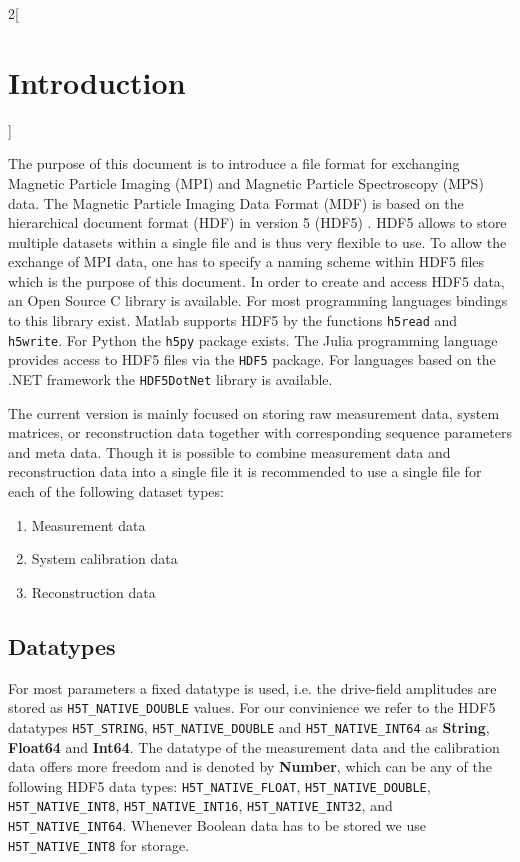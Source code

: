 \documentclass[landscape,a4paper]{article} %
\newcommand{\inl}[1]{\lstinline[columns=fixed]{#1}}
\newcommand{\inltab}[1]{{\ttfamily\bfseries\color{blue}#1}}
\begin{document}
\begin{multicols}{2}[\section{Introduction} \label{Sec:Introduction}]

The purpose of this document is to introduce a file format for exchanging Magnetic Particle Imaging (MPI) and Magnetic Particle Spectroscopy (MPS) data. The Magnetic Particle Imaging Data Format (MDF) is based on the hierarchical document format (HDF) in version 5 (HDF5) \cite{hdf5}. HDF5 allows to store multiple datasets within a single file and is thus very flexible to use. To allow the exchange of MPI data, one has to specify a naming scheme within HDF5 files which is the purpose of this document. In order to create and access HDF5 data, an Open Source C library is available. For most programming languages bindings to this library exist. Matlab supports HDF5 by the functions \inl{h5read} and \inl{h5write}. For Python the \inl{h5py} package exists. The Julia programming language provides access to HDF5 files via the \inl{HDF5} package. For languages based on the .NET framework the \inl{HDF5DotNet} library is available.

The current version is mainly focused on storing raw measurement data, system matrices, or reconstruction data together with corresponding sequence parameters and meta data. Though it is possible to combine measurement data and reconstruction data into a single file it is recommended to use a single file for each of the following dataset types:
\begin{enumerate}
\setlength{\itemsep}{0pt}
\item Measurement data
\item System calibration data
\item Reconstruction data
\end{enumerate}

\subsection{Datatypes}

For most parameters a fixed datatype is used, i.e. the drive-field amplitudes are stored as \inl{H5T_NATIVE_DOUBLE} values. For our convinience we refer to the HDF5 datatypes \inl{H5T_STRING}, \inl{H5T_NATIVE_DOUBLE} and \inl{H5T_NATIVE_INT64} as \inltab{String}, \inltab{Float64} and \inltab{Int64}. The datatype of the measurement data and the calibration data offers more freedom and is denoted by \inltab{Number}, which can be any of the following HDF5 data types: \inl{H5T_NATIVE_FLOAT}, \inl{H5T_NATIVE_DOUBLE}, \inl{H5T_NATIVE_INT8}, \inl{H5T_NATIVE_INT16}, \inl{H5T_NATIVE_INT32}, and \inl{H5T_NATIVE_INT64}. Whenever Boolean data has to be stored we use \inl{H5T_NATIVE_INT8} for storage.


\end{multicols}
\end{document}
